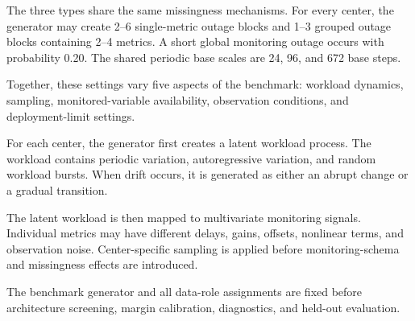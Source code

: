 \documentclass[11pt,a4paper]{article}
\begin{document}
The three types share the same missingness mechanisms.
For every center, the generator may create 2--6 single-metric outage
blocks and 1--3 grouped outage blocks containing 2--4 metrics.
A short global monitoring outage occurs with probability 0.20.
The shared periodic base scales are 24, 96, and 672 base steps.

Together, these settings vary five aspects of the benchmark: workload
dynamics, sampling, monitored-variable availability, observation conditions,
and deployment-limit settings.

For each center, the generator first creates a latent workload process.
The workload contains periodic variation, autoregressive variation, and
random workload bursts.
When drift occurs, it is generated as either an abrupt change or a gradual
transition.

The latent workload is then mapped to multivariate monitoring signals.
Individual metrics may have different delays, gains, offsets, nonlinear
terms, and observation noise.
Center-specific sampling is applied before monitoring-schema and missingness
effects are introduced.

The benchmark generator and all data-role assignments are fixed before
architecture screening, margin calibration, diagnostics, and held-out
evaluation.
\end{document}

